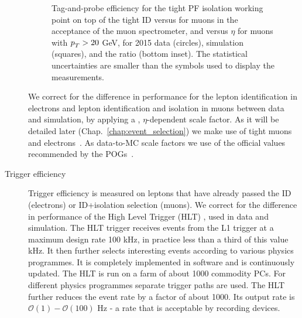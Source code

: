 \begin{description}
\begin{figure}[htp]
\centering
  \def\twidth{0.45}
  \centering
  \hfil
\caption{Tag-and-probe efficiency for the tight PF isolation working point on top of the tight ID versus \pt for muons in the acceptance of the muon spectrometer, and versus $\eta$ for muons with $p_{T}^{}> 20$ GeV, for 2015 data (circles), simulation (squares), and the ratio (bottom inset). The statistical uncertainties are smaller than the symbols used to display the measurements.  \cite{Sirunyan:2018fpa}}
\label{fig:CMS-MUO-16-001_Figure_008}
\end{figure}

We correct for the difference in performance for the lepton identification in electrons and lepton identification and isolation in muons between data and simulation, by applying a \pt, $\eta$-dependent scale factor. As it will be detailed later (Chap.~\ref{chap:event_selection}) we make use of tight muons~\cite{twiki:MUO} and electrons~\cite{twiki:EGM}. As data-to-MC scale factors we use of the official values recommended by the POGs~\cite{twiki:MuonSF,twiki:EGMSF}.


\item[Trigger efficiency]

Trigger efficiency is measured on leptons that have already passed the ID (electrons) or ID+isolation selection (muons). We correct for the difference in performance of the High Level Trigger (HLT) \cite{Adam:2005zf}, \cite{Sphicas:2002gg} used in data and simulation. The HLT trigger receives events from the L1 trigger at a maximum design rate 100 kHz, in practice less than a third of this value kHz. It then further selects interesting events according to various physics programmes. It is completely implemented in software and is continuously updated. The HLT is run on a farm of about 1000 commodity PCs. For different physics programmes separate trigger paths are used. The HLT further reduces the event rate by a factor of about 1000. Its output rate is $\mathcal{O}(1)-\mathcal{O}(100)$ Hz - a rate that is acceptable by recording devices.


\end{description}
